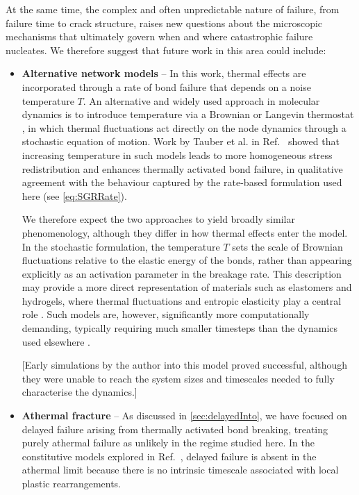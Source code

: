 \documentclass[asymmetricmargins]{library/duthesis}%
\begin{document}
At the same time, the complex and often unpredictable nature of failure, from failure time to crack structure, raises new questions about the microscopic mechanisms that ultimately govern when and where catastrophic failure nucleates. We therefore suggest that future work in this area could include:
\begin{itemize}
    \item {\bf Alternative network models} -- In this work, thermal effects are incorporated through a rate of bond failure that depends on a noise temperature $T$. An alternative and widely used approach in molecular dynamics is to introduce temperature via a Brownian or Langevin thermostat \cite{allen_computer_2017}, in which thermal fluctuations act directly on the node dynamics through a stochastic equation of motion. Work by Tauber et al. in Ref.~\cite{tauber_role_2020} showed that increasing temperature in such models leads to more homogeneous stress redistribution and enhances thermally activated bond failure, in qualitative agreement with the behaviour captured by the rate-based formulation used here (see \cref{eq:SGRRate}).

    We therefore expect the two approaches to yield broadly similar phenomenology, although they differ in how thermal effects enter the model. In the stochastic formulation, the temperature $T$ sets the scale of Brownian fluctuations relative to the elastic energy of the bonds, rather than appearing explicitly as an activation parameter in the breakage rate. This description may provide a more direct representation of materials such as elastomers and hydrogels, where thermal fluctuations and entropic elasticity play a central role \cite{arruda_three-dimensional_1993,james_theory_1943}. Such models are, however, significantly more computationally demanding, typically requiring much smaller timesteps than the dynamics used elsewhere \cite{leimkuhler_robust_2013}.

    [Early simulations by the author into this model proved successful, although they were unable to reach the system sizes and timescales needed to fully characterise the dynamics.]

    \item {\bf Athermal fracture} -- As discussed in \cref{sec:delayedInto}, we have focused on delayed failure arising from thermally activated bond breaking, treating purely athermal failure as unlikely in the regime studied here. In the constitutive models explored in Ref.~\cite{lockwood_ultradelayed_2025}, delayed failure is absent in the athermal limit because there is no intrinsic timescale associated with local plastic rearrangements.


\end{itemize}
\end{document}
